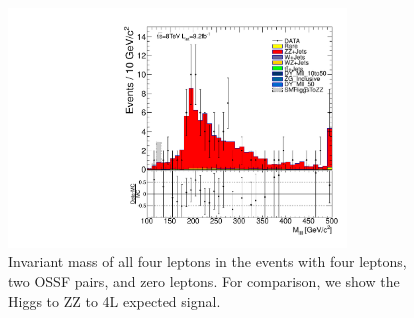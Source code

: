 \begin{figure}[h!]
\begin{center}
\includegraphics[width=0.8\textwidth]{plots/h_Four_invm4l_2OSSF.pdf}
\caption{Invariant mass of all four leptons in the events with four leptons, two OSSF pairs, and zero leptons. 
For comparison, we show the Higgs to ZZ to 4L expected signal.}
\label{fig:L4OSSF2Mass4L}
\end{center}
\end{figure}

